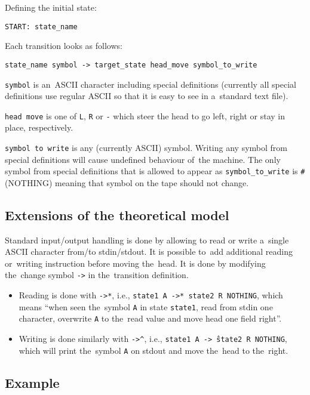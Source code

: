 \documentclass[english,shortabstract,mgr]{iithesis}
\begin{document}
Defining the initial state:
\begin{verbatim}
START: state_name
\end{verbatim}

Each transition looks as follows:
\begin{verbatim}
state_name symbol -> target_state head_move symbol_to_write
\end{verbatim}

\texttt{symbol} is an~ASCII character including special definitions (currently
all special definitions use regular ASCII so that it is easy to see
in a~standard text file).

\texttt{head move} is one of \texttt{L}, \texttt{R} or \texttt{-} which
steer the head to go left, right or stay in place, respectively.

\texttt{symbol to write} is any (currently ASCII) symbol. Writing any symbol
from special definitions will cause undefined behaviour of~the machine. The only symbol
from special definitions that is allowed to appear as \texttt{symbol\_to\_write}
is \texttt{\#} (NOTHING) meaning that symbol on the tape should not change.

\subsection {Extensions of the theoretical model}

Standard input/output handling is done by allowing to read or write a~single
ASCII character from/to stdin/stdout. It is possible to~add additional
reading or~writing instruction before moving the~head. It is done by modifying
the~change symbol \texttt{->} in the~transition definition.
\begin{itemize}
  \item Reading is done with \texttt{->*}, i.e., \texttt{state1 A ->* state2 R NOTHING},
        which means ``when seen the~symbol \texttt{A} in state \texttt{state1}, read
        from stdin one character, overwrite \texttt{A} to the~read value and move
        head one field right''.
  \item Writing is done similarly with \texttt{->\^},
        i.e., \texttt{state1 A ->\^\ state2 R NOTHING}, which will print the~symbol
        \texttt{A} on stdout and move the~head to the~right.
\end{itemize}

\subsection{Example} \label{turing_machine_example}
\end{document}
